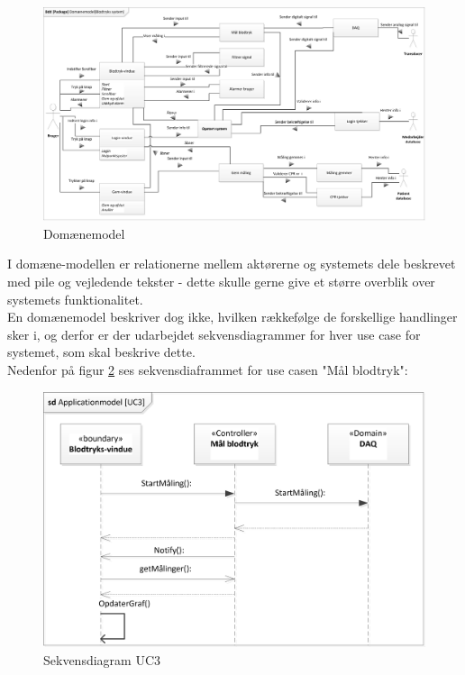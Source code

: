  \begin{figure}[H]
	\centering
	\includegraphics[width=1\textwidth]{Figurer/ISE/Domaenemodel}
	\caption{Domænemodel}
	\label{domaenemodel}
\end{figure}

I domæne-modellen er relationerne mellem aktørerne og systemets dele beskrevet med pile og vejledende tekster - dette skulle gerne give et større overblik over systemets funktionalitet. \\ 
En domænemodel beskriver dog ikke, hvilken rækkefølge de forskellige handlinger sker i, og derfor er der udarbejdet sekvensdiagrammer for hver use case for systemet, som skal beskrive dette.\\
Nedenfor på figur \ref{sekvensdiagram} ses sekvensdiaframmet for use casen "Mål blodtryk":

\begin{figure}[H]
	\centering
	\includegraphics[width=1\textwidth]{Figurer/ISE/sdAppModelUC3}
	\caption{Sekvensdiagram UC3}
	\label{sekvensdiagram}
\end{figure}

